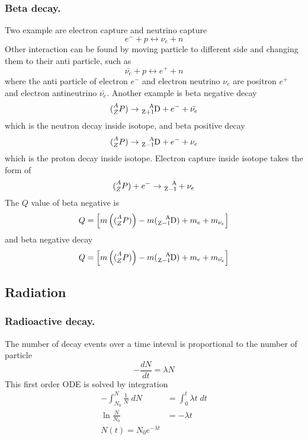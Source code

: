\documentclass[../../../main.tex]{subfiles}
\begin{document}
\subsubsection*{Beta decay.} Two example are electron capture and neutrino capture 
\begin{equation*}
    e^-+p\leftrightarrow \nu_e+n
\end{equation*} 
Other interaction can be found by moving particle to different side and changing them to their anti particle, such as 
\begin{equation*}
    \bar{\nu_e}+p\leftrightarrow e^++n
\end{equation*}
where the anti particle of electron $e^-$ and electron neutrino $\nu_e$ are positron $e^+$ and electron antineutrino $\bar{\nu_e}$. Another example is beta negative decay
\begin{equation*}
    \ce(^A_ZP)\rightarrow\ce{^A_{Z+1}D}+e^-+\bar{\nu_e}
\end{equation*} 
which is the neutron decay inside isotope, and beta positive decay
\begin{equation*}
    \ce(^A_ZP)\rightarrow\ce{^A_{Z-1}D}+e^-+{\nu_e}
\end{equation*}
which is the proton decay inside isotope. Electron capture inside isotope takes the form of 
\begin{equation*}
    \ce(^A_ZP)+e^-\rightarrow \ce{^A_{Z-1}}+\nu_e
\end{equation*}
The $Q$ value of beta negative is 
\begin{equation*}
    Q=\left[m\left(\ce(^A_ZP)\right)-m(\ce{^A_{Z-1}D})+m_e+m_{\nu_e}\right]
\end{equation*}
and beta negative decay 
\begin{equation*}
    Q=\left[m\left(\ce(^A_ZP)\right)-m(\ce{^A_{Z-1}D})+m_e+m_{\bar{\nu_e}}\right]
\end{equation*}

\subsection*{Radiation}
\subsubsection*{Radioactive decay.} The number of decay events over a time inteval is proportional to the number of particle
\begin{equation*}
    -\frac{dN}{dt}=\lambda N
\end{equation*}
This first order ODE is solved by integration
\begin{align*}
    -\int_{N_0}^{N}\frac{1}{N}\;dN&=\int_{0}^{t}\lambda t\;dt\\
    \ln\frac{N}{N_0}&=-\lambda t\\
    N(t)=N_0e^{-\lambda t}
\end{align*}
\end{document}
